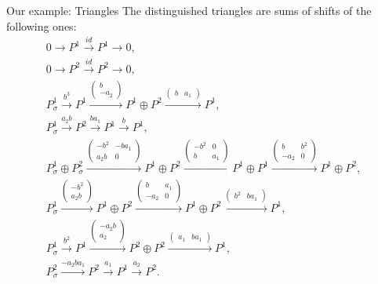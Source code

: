 \documentclass{beamer}
\begin{document}
  \begin{frame}{Our example: Triangles}
    The distinguished triangles are sums of shifts of the following ones:
    \begin{equation*}
	\begin{gathered}
		0\xrightarrow{}P^1\xrightarrow{id}P^1\xrightarrow{} 0,\\
		0\xrightarrow{}P^2\xrightarrow{id}P^2\xrightarrow{} 0,\\
		P^1_\sigma\xrightarrow{b^3}P^1\xrightarrow{\left(\begin{smallmatrix}b\\-a_2\end{smallmatrix}\right)}
		P^1\oplus P^2\xrightarrow{\left(\begin{smallmatrix}b&a_1\end{smallmatrix}\right)} P^1,\\
		P^1_\sigma\xrightarrow{a_2b}P^2\xrightarrow{ba_1} P^1\xrightarrow{b} P^1,\\
		P^1_\sigma\oplus P^2_\sigma\xrightarrow{\left(\begin{smallmatrix}-b^2&-ba_1\\a_2b&0\end{smallmatrix}\right)}P^1\oplus P^2\xrightarrow{\left(\begin{smallmatrix}-b^2&0\\b&a_1\end{smallmatrix}\right)} P^1\oplus P^1\xrightarrow{\left(\begin{smallmatrix}b&b^2\\-a_2&0\end{smallmatrix}\right)} P^1\oplus P^2,\\
		P^1_\sigma\xrightarrow{\left(\begin{smallmatrix}-b^2\\a_2b\end{smallmatrix}\right)}P^1\oplus P^2\xrightarrow{\left(\begin{smallmatrix}b&a_1\\-a_2&0\end{smallmatrix}\right)} P^1\oplus P^2\xrightarrow{\left(\begin{smallmatrix}b^2&ba_1\end{smallmatrix}\right)} P^1,\\
		P^1_{\sigma}\xrightarrow{b^2}P^1\xrightarrow{\left(\begin{smallmatrix}-a_2b\\a_2\end{smallmatrix}\right)}P^2\oplus P^2\xrightarrow{\left(\begin{smallmatrix}a_1&ba_1\end{smallmatrix}\right)}P^1,\\
		P^2_\sigma\xrightarrow{-a_2ba_1}P^2\xrightarrow{a_1}P^1\xrightarrow{a_2}P^2.
	\end{gathered}
\end{equation*}
  \end{frame}
\end{document}
